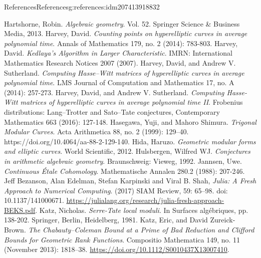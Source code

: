\documentclass[oneside,10pt,]{book}
\numberwithin{equation}{section}
\begin{document}
\begin{references-chapter-numberless}{References}{}{References}{}{}{g:references:idm207413918832}
\begin{thebibliography}{9}
\hypertarget{x:biblio:bib-hartshorne}{}Hartshorne, Robin. \textit{Algebraic geometry}. Vol. 52. Springer Science \& Business Media, 2013.
\hypertarget{x:biblio:bib-harvey-average}{}Harvey, David. \textit{Counting points on hyperelliptic curves in average polynomial time}. Annals of Mathematics 179, no. 2 (2014): 783-803.
\hypertarget{x:biblio:bib-harvey-sqrtp}{}Harvey, David. \textit{Kedlaya's Algorithm in Larger Characteristic}. IMRN: International Mathematics Research Notices 2007 (2007).
\hypertarget{x:biblio:bib-harvey-sutherland}{}Harvey, David, and Andrew V. Sutherland. \textit{Computing Hasse–Witt matrices of hyperelliptic curves in average polynomial time}. LMS Journal of Computation and Mathematics 17, no. A (2014): 257-273.
\hypertarget{x:biblio:bib-harvey-sutherland-ii}{}Harvey, David, and Andrew V. Sutherland. \textit{Computing Hasse-Witt matrices of hyperelliptic curves in average polynomial time II}. Frobenius distributions: Lang–Trotter and Sato–Tate conjectures, Contemporary Mathematics 663 (2016): 127-148.
\hypertarget{x:biblio:bib-hasegawa-shimura}{}Hasegawa, Yuji, and Mahoro Shimura. \textit{Trigonal Modular Curves}. Acta Arithmetica 88, no. 2 (1999): 129–40. https:\slash{}\slash{}doi.org\slash{}10.4064\slash{}aa-88-2-129-140.
\hypertarget{x:biblio:bib-hida-geometric}{}Hida, Haruzo. \textit{Geometric modular forms and elliptic curves}. World Scientific, 2012.
\hypertarget{x:biblio:bib-hulsbergen}{}Hulsbergen, Wilfred WJ. \textit{Conjectures in arithmetic algebraic geometry}. Braunschweig: Vieweg, 1992.
\hypertarget{x:biblio:bib-jannsen}{}Jannsen, Uwe. \textit{Continuous Étale Cohomology}. Mathematische Annalen 280.2 (1988): 207-246.
\hypertarget{x:biblio:bib-julia}{}Jeff Bezanson, Alan Edelman, Stefan Karpinski and Viral B. Shah, \textit{Julia: A Fresh Approach to Numerical Computing}.  (2017) SIAM Review, 59: 65–98. doi: 10.1137\slash{}141000671. \url{https://julialang.org/research/julia-fresh-approach-BEKS.pdf}.
\hypertarget{x:biblio:bib-katz-serre-tate}{}Katz, Nicholas. \textit{Serre-Tate local moduli}. In Surfaces algébriques, pp. 138-202. Springer, Berlin, Heidelberg, 1981.
\hypertarget{x:biblio:bib-katz-zureick-clifford}{}Katz, Eric, and David Zureick-Brown. \textit{The Chabauty–Coleman Bound at a Prime of Bad Reduction and Clifford Bounds for Geometric Rank Functions}. Compositio Mathematica 149, no. 11 (November 2013): 1818–38. \url{https://doi.org/10.1112/S0010437X13007410}.

\end{thebibliography}
\end{references-chapter-numberless}
\end{document}

